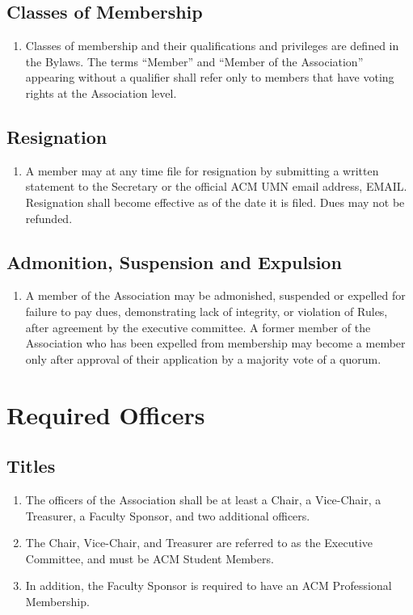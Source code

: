 \documentclass[12pt,letterpaper]{article}
\begin{document}
\subsection{Classes of Membership}
\begin{enumerate}
	\item Classes of membership and their qualifications and privileges are
	      defined in the Bylaws. The terms ``Member'' and ``Member of the
				Association'' appearing without a qualifier shall refer only to
				members  that have voting rights at the Association level.
\end{enumerate}

\subsection{Resignation}
\begin{enumerate}
	\item A member may at any time file for resignation by submitting a written
	      statement to the Secretary or the official ACM UMN email address,
				EMAIL. Resignation shall become effective as of the date it is filed.
				Dues may not be refunded.
\end{enumerate}

\subsection{Admonition, Suspension and Expulsion}
\begin{enumerate}
	\item A member of the Association may be admonished, suspended or expelled
	      for failure to pay dues, demonstrating lack of integrity, or violation
				of Rules, after agreement by the executive committee. A former member
				of the Association who has been expelled from membership may become
				a member only after approval of their application by a majority vote
				of a quorum.
\end{enumerate}

\section{Required Officers}

\subsection{Titles}
\begin{enumerate}
	\item The officers of the Association shall be at least a Chair, a Vice-Chair,
	      a Treasurer, a Faculty Sponsor, and two additional officers.
	\item The Chair, Vice-Chair, and Treasurer are referred to as the Executive
	      Committee, and must be ACM Student Members.
	\item In addition, the Faculty Sponsor is required to have an ACM Professional
	      Membership.
\end{enumerate}
\end{document}
